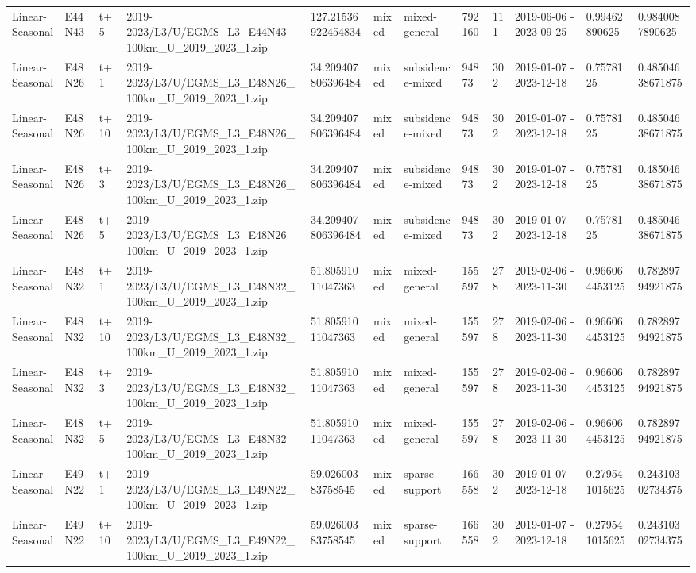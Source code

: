 \begin{landscape}
\begin{longtable}{llllllllllll}
Linear-Seasonal & E44N43 & t+5 & 2019-2023/L3/U/EGMS\_L3\_E44N43\_100km\_U\_2019\_2023\_1.zip & 127.21536922454834 & mixed & mixed-general & 792160 & 111 & 2019-06-06 - 2023-09-25 & 0.99462890625 & 0.9840087890625 \\
Linear-Seasonal & E48N26 & t+1 & 2019-2023/L3/U/EGMS\_L3\_E48N26\_100km\_U\_2019\_2023\_1.zip & 34.209407806396484 & mixed & subsidence-mixed & 94873 & 302 & 2019-01-07 - 2023-12-18 & 0.7578125 & 0.48504638671875 \\
Linear-Seasonal & E48N26 & t+10 & 2019-2023/L3/U/EGMS\_L3\_E48N26\_100km\_U\_2019\_2023\_1.zip & 34.209407806396484 & mixed & subsidence-mixed & 94873 & 302 & 2019-01-07 - 2023-12-18 & 0.7578125 & 0.48504638671875 \\
Linear-Seasonal & E48N26 & t+3 & 2019-2023/L3/U/EGMS\_L3\_E48N26\_100km\_U\_2019\_2023\_1.zip & 34.209407806396484 & mixed & subsidence-mixed & 94873 & 302 & 2019-01-07 - 2023-12-18 & 0.7578125 & 0.48504638671875 \\
Linear-Seasonal & E48N26 & t+5 & 2019-2023/L3/U/EGMS\_L3\_E48N26\_100km\_U\_2019\_2023\_1.zip & 34.209407806396484 & mixed & subsidence-mixed & 94873 & 302 & 2019-01-07 - 2023-12-18 & 0.7578125 & 0.48504638671875 \\
Linear-Seasonal & E48N32 & t+1 & 2019-2023/L3/U/EGMS\_L3\_E48N32\_100km\_U\_2019\_2023\_1.zip & 51.80591011047363 & mixed & mixed-general & 155597 & 278 & 2019-02-06 - 2023-11-30 & 0.966064453125 & 0.78289794921875 \\
Linear-Seasonal & E48N32 & t+10 & 2019-2023/L3/U/EGMS\_L3\_E48N32\_100km\_U\_2019\_2023\_1.zip & 51.80591011047363 & mixed & mixed-general & 155597 & 278 & 2019-02-06 - 2023-11-30 & 0.966064453125 & 0.78289794921875 \\
Linear-Seasonal & E48N32 & t+3 & 2019-2023/L3/U/EGMS\_L3\_E48N32\_100km\_U\_2019\_2023\_1.zip & 51.80591011047363 & mixed & mixed-general & 155597 & 278 & 2019-02-06 - 2023-11-30 & 0.966064453125 & 0.78289794921875 \\
Linear-Seasonal & E48N32 & t+5 & 2019-2023/L3/U/EGMS\_L3\_E48N32\_100km\_U\_2019\_2023\_1.zip & 51.80591011047363 & mixed & mixed-general & 155597 & 278 & 2019-02-06 - 2023-11-30 & 0.966064453125 & 0.78289794921875 \\
Linear-Seasonal & E49N22 & t+1 & 2019-2023/L3/U/EGMS\_L3\_E49N22\_100km\_U\_2019\_2023\_1.zip & 59.02600383758545 & mixed & sparse-support & 166558 & 302 & 2019-01-07 - 2023-12-18 & 0.279541015625 & 0.24310302734375 \\
Linear-Seasonal & E49N22 & t+10 & 2019-2023/L3/U/EGMS\_L3\_E49N22\_100km\_U\_2019\_2023\_1.zip & 59.02600383758545 & mixed & sparse-support & 166558 & 302 & 2019-01-07 - 2023-12-18 & 0.279541015625 & 0.24310302734375 \\

\end{longtable}
\end{landscape}

